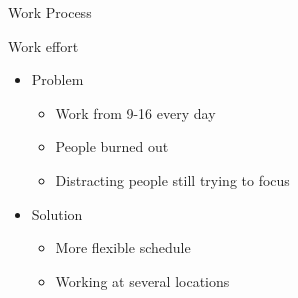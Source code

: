 \begin{frame}{Work Process}
    \begin{block}{Work effort}
    \begin{itemize}
        \item Problem
        \begin{itemize}
            \item Work from 9-16 every day
            \item People burned out
            \item Distracting people still trying to focus
        \end{itemize}
        \item Solution
        \begin{itemize}
            \item More flexible schedule
            \item Working at several locations
        \end{itemize}
    \end{itemize}
    \end{block}
\end{frame}
